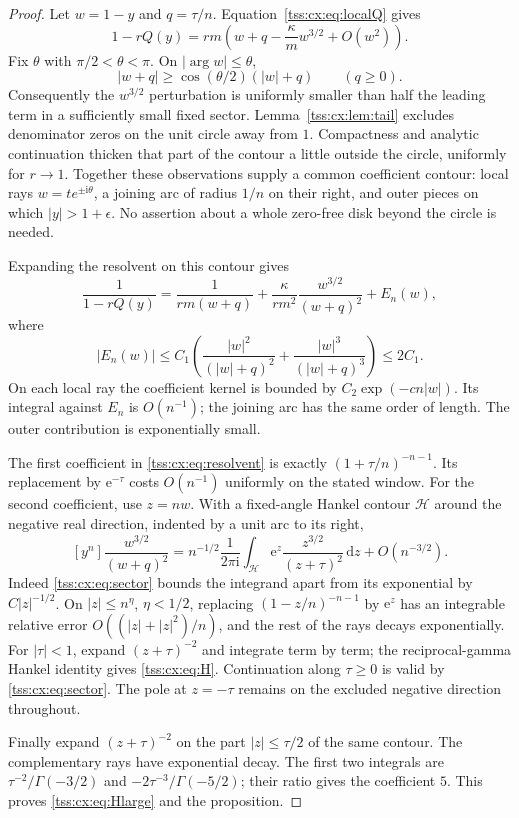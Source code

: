 \documentclass[11pt]{article}
\theoremstyle{remark}\newtheorem{remark}[theorem]{Remark}
\theoremstyle{definition}\newtheorem{definition}[theorem]{Definition}
\newcommand{\ii}{\mathrm i}
\newcommand{\dd}{\mathrm d}
\newcommand{\e}{\mathrm e}
\begin{document}
\begin{proof}
Let $w=1-y$ and $q=\tau/n$. Equation~\eqref{tss:cx:eq:localQ} gives
\[
 1-rQ(y)=rm\left(w+q-\frac{\kappa}{m}w^{3/2}+O(w^2)\right).
\]
Fix $\theta$ with $\pi/2<\theta<\pi$. On
$|\arg w|\le\theta$,
\begin{equation}\label{tss:cx:eq:sector}
 |w+q|\ge\cos(\theta/2)(|w|+q)\qquad(q\ge0).
\end{equation}
Consequently the $w^{3/2}$ perturbation is uniformly smaller than
half the leading term in a sufficiently small fixed sector.
Lemma~\ref{tss:cx:lem:tail} excludes denominator zeros on the unit circle
away from $1$. Compactness and analytic continuation thicken that
part of the contour a little outside the circle, uniformly for
$r\to1$. Together these observations supply a common coefficient
contour: local rays $w=te^{\pm\ii\theta}$, a joining arc of radius
$1/n$ on their right, and outer pieces on which $|y|>1+\epsilon$.
No assertion about a whole zero-free disk beyond the circle is needed.

Expanding the resolvent on this contour gives
\begin{equation}\label{tss:cx:eq:resolvent}
 \frac1{1-rQ(y)}=\frac1{rm(w+q)}
 +\frac{\kappa}{rm^2}\frac{w^{3/2}}{(w+q)^2}+E_n(w),
\end{equation}
where
\[
 |E_n(w)|\le C_1\left(
 \frac{|w|^2}{(|w|+q)^2}
 +\frac{|w|^3}{(|w|+q)^3}\right)\le2C_1.
\]
On each local ray the coefficient kernel is bounded by
$C_2\exp(-c n|w|)$. Its integral against $E_n$ is $O(n^{-1})$;
the joining arc has the same order of length. The outer contribution
is exponentially small.

The first coefficient in \eqref{tss:cx:eq:resolvent} is exactly
$(1+\tau/n)^{-n-1}$. Its replacement by $\e^{-\tau}$ costs
$O(n^{-1})$ uniformly on the stated window. For the second coefficient,
use $z=nw$. With a fixed-angle Hankel contour $\mathcal H$ around the
negative real direction, indented by a unit arc to its right,
\begin{equation}\label{tss:cx:eq:Hankel}
 [y^n]\frac{w^{3/2}}{(w+q)^2}
 =n^{-1/2}\frac1{2\pi\ii}\int_{\mathcal H}
       \e^z\frac{z^{3/2}}{(z+\tau)^2}\,\dd z+O(n^{-3/2}).
\end{equation}
Indeed \eqref{tss:cx:eq:sector} bounds the integrand apart from its exponential
by $C|z|^{-1/2}$. On $|z|\le n^\eta$, $\eta<1/2$, replacing
$(1-z/n)^{-n-1}$ by $\e^z$ has an integrable relative error
$O((|z|+|z|^2)/n)$, and the rest of the rays decays exponentially.
For $|\tau|<1$, expand $(z+\tau)^{-2}$ and integrate term by term;
the reciprocal-gamma Hankel identity gives \eqref{tss:cx:eq:H}. Continuation
along $\tau\ge0$ is valid by \eqref{tss:cx:eq:sector}. The pole at $z=-\tau$
remains on the excluded negative direction throughout.

Finally expand $(z+\tau)^{-2}$ on the part $|z|\le\tau/2$ of the same
contour. The complementary rays have exponential decay. The first
two integrals are $\tau^{-2}/\Gamma(-3/2)$ and
$-2\tau^{-3}/\Gamma(-5/2)$; their ratio gives the coefficient $5$.
This proves \eqref{tss:cx:eq:Hlarge} and the proposition.
\end{proof}
\end{document}
